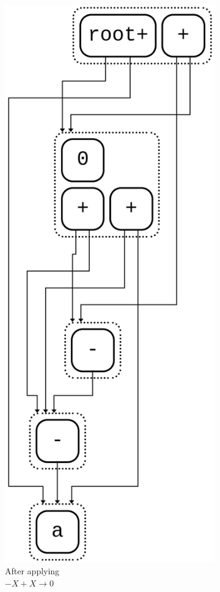 \begin{figure}[h]
\begin{subfigure}[t]{0.23\textwidth}
		\includegraphics[width=1.4\linewidth,height=1.4\linewidth,keepaspectratio=true]{img/e_graph3.png}
		\caption{\scriptsize After applying\\$-X + X \to 0$}
		\label{fig:e-graph-sub3}
	\end{subfigure}
	\hfill
	\begin{subfigure}[t]{0.23\textwidth}
		\centering

\end{subfigure}
\end{figure}
